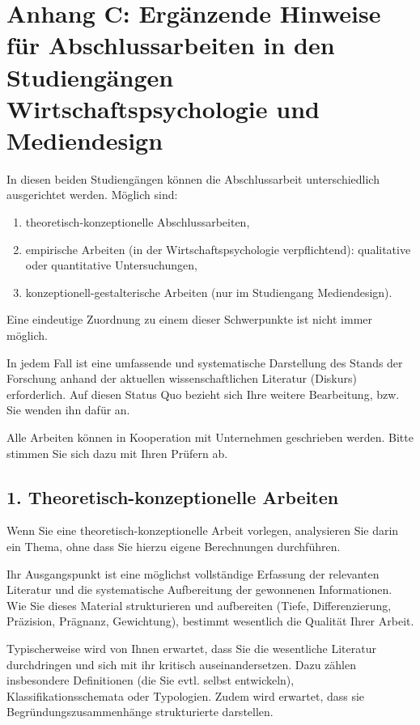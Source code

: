 \chapter*{Anhang C: Ergänzende Hinweise für Abschlussarbeiten in den Studiengängen Wirtschaftspsychologie und Mediendesign}
\label{app:wirtschaftspsychologie-mediendesign}

In diesen beiden Studiengängen können die Abschlussarbeit unterschiedlich ausgerichtet werden. Möglich sind:
\begin{enumerate}
\item theoretisch-konzeptionelle Abschlussarbeiten,
\item empirische Arbeiten (in der Wirtschaftspsychologie verpflichtend): qualitative oder quantitative Untersuchungen,
\item konzeptionell-gestalterische Arbeiten (nur im Studiengang Mediendesign).
\end{enumerate}

Eine eindeutige Zuordnung zu einem dieser Schwerpunkte ist nicht immer möglich.

In jedem Fall ist eine umfassende und systematische Darstellung des Stands der Forschung anhand der aktuellen wissenschaftlichen Literatur (Diskurs) erforderlich. Auf diesen Status Quo bezieht sich Ihre weitere Bearbeitung, bzw. Sie wenden ihn dafür an.

Alle Arbeiten können in Kooperation mit Unternehmen geschrieben werden. Bitte stimmen Sie sich dazu mit Ihren Prüfern ab.

\section*{1. Theoretisch-konzeptionelle Arbeiten}

Wenn Sie eine theoretisch-konzeptionelle Arbeit vorlegen, analysieren Sie darin ein Thema, ohne dass Sie hierzu eigene Berechnungen durchführen.

Ihr Ausgangspunkt ist eine möglichst vollständige Erfassung der relevanten Literatur und die systematische Aufbereitung der gewonnenen Informationen. Wie Sie dieses Material strukturieren und aufbereiten (Tiefe, Differenzierung, Präzision, Prägnanz, Gewichtung), bestimmt wesentlich die Qualität Ihrer Arbeit.

Typischerweise wird von Ihnen erwartet, dass Sie die wesentliche Literatur durchdringen und sich mit ihr kritisch auseinandersetzen. Dazu zählen insbesondere Definitionen (die Sie evtl. selbst entwickeln), Klassifikationsschemata oder Typologien. Zudem wird erwartet, dass sie Begründungszusammenhänge strukturierte darstellen.

